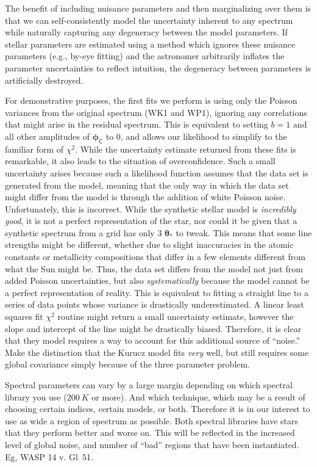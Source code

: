\documentclass[iop,floatfix]{emulateapj}
\newcommand{\vt}{ {\bm \theta}}
\newcommand{\vp}{ {\bm \phi}}
\newcommand{\cov}{ \vp_{\mathsf{C}}}
\begin{document}
The benefit of including nuisance parameters and then marginalizing over them is that we can self-consistently model the uncertainty inherent to any spectrum while naturally capturing any degeneracy between the model parameters. If stellar parameters are estimated using a method which ignores these nuisance parameters (e.g., by-eye fitting) and the astronomer arbitrarily inflates the parameter uncertainties to reflect intuition, the degeneracy between parameters is artificially destroyed. 

For demonstrative purposes, the first fits we perform is using only the Poisson variances from the original spectrum (WK1 and WP1), ignoring any correlations that might arise in the residual spectrum. This is equivalent to setting $b=1$ and all other amplitudes of $\cov$ to 0, and allows our likelihood to simplify to the familiar form of $\chi^2$. While the uncertainty estimate returned from these fits is remarkable, it also leads to the situation of overconfidence. Such a small uncertainty arises because such a likelihood function assumes that the data set is generated from the model, meaning that the only way in which the data set might differ from the model is through the addition of white Poisson noise. Unfortunately, this is incorrect. While the synthetic stellar model is \emph{incredibly good}, it is not a perfect representation of the star, nor could it be given that a synthetic spectrum from a grid has only 3 $\vt_\ast$ to tweak. This means that some line strengths might be different, whether due to slight inaccuracies in the atomic constants or metallicity compositions that differ in a few elements different from what the Sun might be. Thus, the data set differs from the model not just from added Poisson uncertainties, but also \emph{systematically} because the model cannot be a perfect representation of reality. This is equivalent to fitting a straight line to a series of data points whose variance is drastically underestimated. A linear least squares fit $\chi^2$ routine might return a small uncertainty estimate, however the slope and intercept of the line might be drastically biased. Therefore, it is clear that they model requires a way to account for this additional source of ``noise.'' Make the distinction that the Kurucz model fits \emph{very} well, but still requires some global covariance simply because of the three parameter problem.


Spectral parameters can vary by a large margin depending on which spectral library you use ($200~K$ or more). And which technique, which may be a result of choosing certain indices, certain models, or both. Therefore it is in our interest to use as wide a region of spectrum as possible. Both spectral libraries have stars that they perform better and worse on. This will be reflected in the increased level of global noise, and number of ``bad'' regions that have been instantiated. Eg, WASP 14 v. Gl~51.
\end{document}
